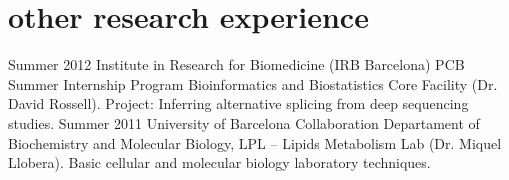 \documentclass[]{friggeri-cv}
\begin{document}
\section{other research experience}

\begin{entrylist}
	\entry
	{Summer 2012}
	{Institute in Research for Biomedicine (IRB Barcelona)}
	{PCB Summer Internship Program}
	{Bioinformatics and Biostatistics Core Facility (Dr. David Rossell). Project: Inferring alternative splicing from deep sequencing studies.}
	\entry
	{Summer 2011}
	{University of Barcelona}
	{Collaboration}
	{Departament of Biochemistry and Molecular Biology, LPL -- Lipids Metabolism Lab (Dr. Miquel Llobera). Basic cellular and molecular biology laboratory techniques.}
\end{entrylist}




%
\end{document}
